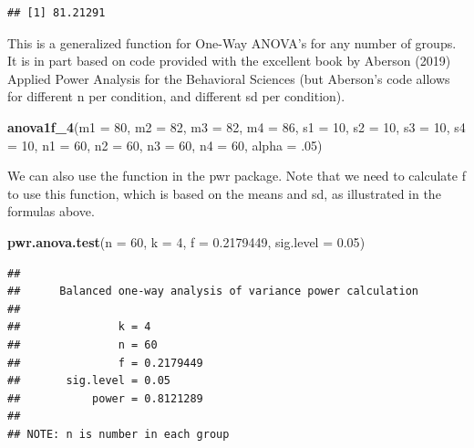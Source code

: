 \documentclass[]{book}
\newenvironment{Shaded}{\begin{snugshade}}{\end{snugshade}}
\newcommand{\DataTypeTok}[1]{\textcolor[rgb]{0.13,0.29,0.53}{#1}}
\newcommand{\DecValTok}[1]{\textcolor[rgb]{0.00,0.00,0.81}{#1}}
\newcommand{\FloatTok}[1]{\textcolor[rgb]{0.00,0.00,0.81}{#1}}
\newcommand{\KeywordTok}[1]{\textcolor[rgb]{0.13,0.29,0.53}{\textbf{#1}}}
\newcommand{\NormalTok}[1]{#1}
\begin{document}
\begin{verbatim}
## [1] 81.21291
\end{verbatim}

This is a generalized function for One-Way ANOVA's for any number of groups. It is in part based on code provided with the excellent book by Aberson (2019) Applied Power Analysis for the Behavioral Sciences (but Aberson's code allows for different n per condition, and different sd per condition).

\begin{Shaded}
\begin{Highlighting}[]
\KeywordTok{anova1f_4}\NormalTok{(}\DataTypeTok{m1 =} \DecValTok{80}\NormalTok{, }\DataTypeTok{m2 =} \DecValTok{82}\NormalTok{, }\DataTypeTok{m3 =} \DecValTok{82}\NormalTok{, }\DataTypeTok{m4 =} \DecValTok{86}\NormalTok{,}
          \DataTypeTok{s1 =} \DecValTok{10}\NormalTok{, }\DataTypeTok{s2 =} \DecValTok{10}\NormalTok{, }\DataTypeTok{s3 =} \DecValTok{10}\NormalTok{, }\DataTypeTok{s4 =} \DecValTok{10}\NormalTok{,}
          \DataTypeTok{n1 =} \DecValTok{60}\NormalTok{, }\DataTypeTok{n2 =} \DecValTok{60}\NormalTok{, }\DataTypeTok{n3 =} \DecValTok{60}\NormalTok{, }\DataTypeTok{n4 =} \DecValTok{60}\NormalTok{,}
          \DataTypeTok{alpha =} \FloatTok{.05}\NormalTok{)}
\end{Highlighting}
\end{Shaded}

We can also use the function in the pwr package. Note that we need to calculate f to use this function, which is based on the means and sd, as illustrated in the formulas above.

\begin{Shaded}
\begin{Highlighting}[]
\KeywordTok{pwr.anova.test}\NormalTok{(}\DataTypeTok{n =} \DecValTok{60}\NormalTok{,}
               \DataTypeTok{k =} \DecValTok{4}\NormalTok{,}
               \DataTypeTok{f =} \FloatTok{0.2179449}\NormalTok{,}
               \DataTypeTok{sig.level =} \FloatTok{0.05}\NormalTok{)}
\end{Highlighting}
\end{Shaded}

\begin{verbatim}
## 
##      Balanced one-way analysis of variance power calculation 
## 
##               k = 4
##               n = 60
##               f = 0.2179449
##       sig.level = 0.05
##           power = 0.8121289
## 
## NOTE: n is number in each group
\end{verbatim}
\end{document}
